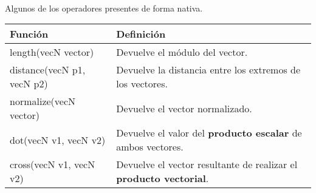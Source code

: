 \\
Algunos de los operadores presentes de forma nativa.
\begin{table}[h]
    \begin{tabularx}{\textwidth}{l|X}
      \toprule
      Función & Definición\\
      \midrule
      length(vecN vector) & Devuelve el módulo del vector.\\
      distance(vecN p1, vecN p2) & Devuelve la distancia entre los extremos de los vectores. \\
      normalize(vecN vector) & Devuelve el vector normalizado. \\
      dot(vecN v1, vecN v2) & Devuelve el valor del \textbf{producto escalar} de ambos vectores. \\
      cross(vecN v1, vecN v2) & Devuelve el vector resultante de realizar el \textbf{producto vectorial}. \\
      \bottomrule
    \end{tabularx}
\end{table}
\newpage
